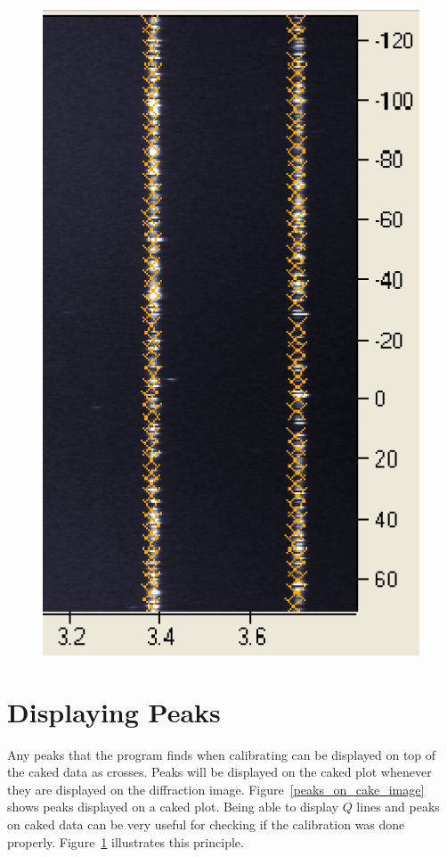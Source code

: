 \begin{figure}[bthp]
{    \includegraphics[scale=.75]{figures/peaks_on_cake_image.eps}}
    \caption{}
    \label{calibration_cake}
\end{figure}

\section{Displaying Peaks}\label{displaying_peaks_cake}

Any peaks that the program finds when 
calibrating can be displayed on top of the caked
data as crosses. Peaks will be displayed on the caked plot whenever 
they are displayed on the diffraction image. 
Figure~\ref{peaks_on_cake_image} 
shows peaks displayed on a caked plot.  Being able to display 
$Q$ lines and peaks on caked data can be very useful for 
checking if the calibration was done properly. 
Figure~\ref{calibration_cake} illustrates this principle.

